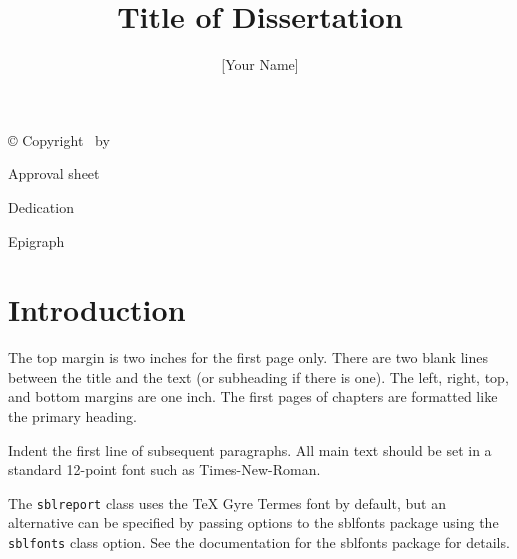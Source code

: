 \documentclass{sblreport}
\begin{document}
\title{Title of Dissertation}
\author{[Your Name]}
\maketitle

\begin{copyrightpage}
  \noindent
  © Copyright \number\year\ by \makeatletter\@author\makeatother
\end{copyrightpage}

\begin{approvalpage}
  \noindent
  Approval sheet
\end{approvalpage}

\begin{dedication}
  \noindent
  Dedication
\end{dedication}

\begin{epigraph}
  \noindent
  Epigraph
\end{epigraph}

\tableofcontents

\listoffigures

\listoftables


\begin{abstract}
\end{abstract}

\begin{acknowledgements}
\end{acknowledgements}

\begin{preface}
\end{preface}

\chapter{Introduction}

The top margin is two inches for the first page only. There are two blank
lines between the title and the text (or subheading if there is one). The
left, right, top, and bottom margins are one inch. The first pages of chapters
are formatted like the primary heading.

Indent the first line of subsequent paragraphs. All main text should be set in
a standard 12-point font such as Times-New-Roman.

The \texttt{sblreport} class uses the TeX Gyre Termes font by default, but an
alternative can be specified by passing options to the \textsf{sblfonts}
package using the \texttt{sblfonts} class option. See the documentation for
the \textsf{sblfonts} package for details.
\end{document}
